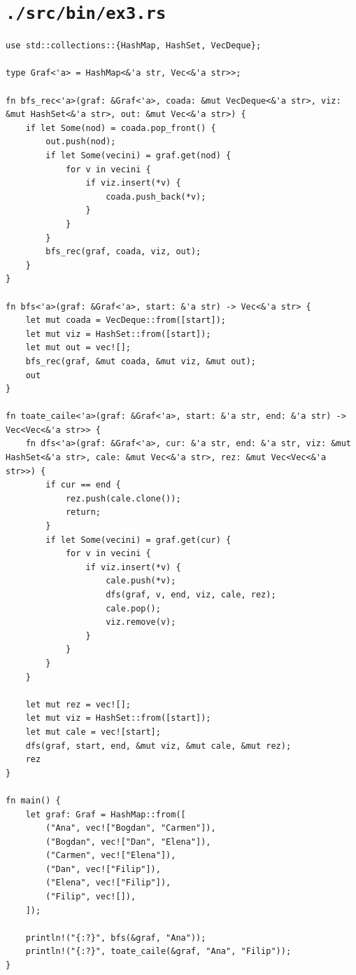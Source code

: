 \documentclass[11pt]{article}
\begin{document}
\section{\texttt{./src/bin/ex3.rs}}
\label{sec:org6ad6240}
\begin{verbatim}
use std::collections::{HashMap, HashSet, VecDeque};

type Graf<'a> = HashMap<&'a str, Vec<&'a str>>;

fn bfs_rec<'a>(graf: &Graf<'a>, coada: &mut VecDeque<&'a str>, viz: &mut HashSet<&'a str>, out: &mut Vec<&'a str>) {
    if let Some(nod) = coada.pop_front() {
        out.push(nod);
        if let Some(vecini) = graf.get(nod) {
            for v in vecini {
                if viz.insert(*v) {
                    coada.push_back(*v);
                }
            }
        }
        bfs_rec(graf, coada, viz, out);
    }
}

fn bfs<'a>(graf: &Graf<'a>, start: &'a str) -> Vec<&'a str> {
    let mut coada = VecDeque::from([start]);
    let mut viz = HashSet::from([start]);
    let mut out = vec![];
    bfs_rec(graf, &mut coada, &mut viz, &mut out);
    out
}

fn toate_caile<'a>(graf: &Graf<'a>, start: &'a str, end: &'a str) -> Vec<Vec<&'a str>> {
    fn dfs<'a>(graf: &Graf<'a>, cur: &'a str, end: &'a str, viz: &mut HashSet<&'a str>, cale: &mut Vec<&'a str>, rez: &mut Vec<Vec<&'a str>>) {
        if cur == end {
            rez.push(cale.clone());
            return;
        }
        if let Some(vecini) = graf.get(cur) {
            for v in vecini {
                if viz.insert(*v) {
                    cale.push(*v);
                    dfs(graf, v, end, viz, cale, rez);
                    cale.pop();
                    viz.remove(v);
                }
            }
        }
    }

    let mut rez = vec![];
    let mut viz = HashSet::from([start]);
    let mut cale = vec![start];
    dfs(graf, start, end, &mut viz, &mut cale, &mut rez);
    rez
}

fn main() {
    let graf: Graf = HashMap::from([
        ("Ana", vec!["Bogdan", "Carmen"]),
        ("Bogdan", vec!["Dan", "Elena"]),
        ("Carmen", vec!["Elena"]),
        ("Dan", vec!["Filip"]),
        ("Elena", vec!["Filip"]),
        ("Filip", vec![]),
    ]);

    println!("{:?}", bfs(&graf, "Ana"));
    println!("{:?}", toate_caile(&graf, "Ana", "Filip"));
}
\end{verbatim}
\end{document}
